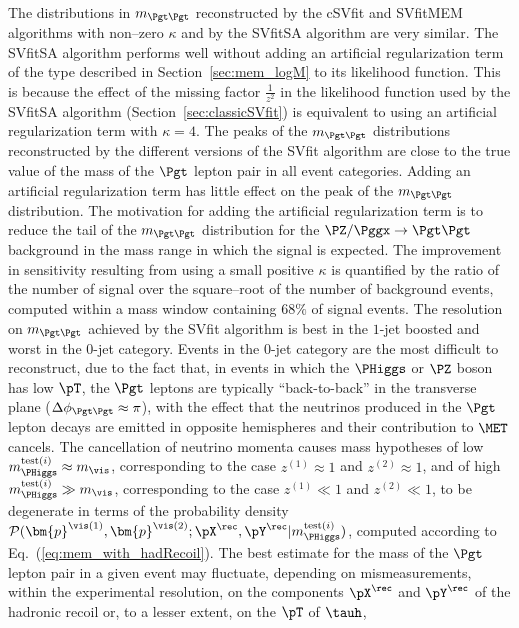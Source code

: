 The distributions in $m_{\Pgt\Pgt}$ reconstructed by the cSVfit and SVfitMEM algorithms with non--zero $\kappa$
and by the SVfitSA algorithm are very similar.
The SVfitSA algorithm performs well without adding an artificial regularization term of the type described in Section~\ref{sec:mem_logM} to its likelihood function.
This is because the effect of the missing factor $\frac{1}{z^{2}}$ in the likelihood function used by the SVfitSA algorithm (\cf Section~\ref{sec:classicSVfit})
is equivalent to using an artificial regularization term with $\kappa = 4$.
The peaks of the $m_{\Pgt\Pgt}$ distributions reconstructed by the different versions of the SVfit algorithm are close to the true value of the mass of the $\Pgt$ lepton pair
in all event categories.
Adding an artificial regularization term has little effect on the peak of the $m_{\Pgt\Pgt}$ distribution.
The motivation for adding the artificial regularization term is to reduce the tail of the $m_{\Pgt\Pgt}$ distribution for the
$\PZ/\Pggx \to \Pgt\Pgt$ background in the mass range in which the signal is expected.
The improvement in sensitivity resulting from using a small positive $\kappa$ is quantified by the ratio of the number of signal over the square--root of the number of background events,
computed within a mass window containing $68\%$ of signal events.
The resolution on $m_{\Pgt\Pgt}$ achieved by the SVfit algorithm is best in the $1$-jet boosted and worst in the $0$-jet category.
Events in the $0$-jet category are the most difficult to reconstruct,
due to the fact that, in events in which the $\PHiggs$ or $\PZ$ boson has low $\pT$, 
the $\Pgt$ leptons are typically ``back-to-back'' in the transverse plane ($\Delta\phi_{\Pgt\Pgt} \approx \pi$),
with the effect that the neutrinos produced in the $\Pgt$ lepton decays are emitted in opposite hemispheres and their contribution to $\MET$ cancels.
The cancellation of neutrino momenta causes mass hypotheses of low $m_{\PHiggs}^{\textrm{test}(i)} \approx m_{\vis}$, corresponding to the case $z^{(1)} \approx 1$ and $z^{(2)} \approx 1$,
and of high $m_{\PHiggs}^{\textrm{test}(i)} \gg m_{\vis}$, corresponding to the case $z^{(1)} \ll 1$ and $z^{(2)} \ll 1$,
to be degenerate in terms of the probability density $\mathcal{P}(\bm{p}^{\vis(1)},\bm{p}^{\vis(2)};\pX^{\rec},\pY^{\rec}|m_{\PHiggs}^{\textrm{test}(i)})$,
computed according to Eq.~(\ref{eq:mem_with_hadRecoil}).
The best estimate for the mass of the $\Pgt$ lepton pair in a given event may fluctuate, 
depending on mismeasurements, within the experimental resolution, 
on the components $\pX^{\rec}$ and $\pY^{\rec}$ of the hadronic recoil or, to a lesser extent, on the $\pT$ of $\tauh$,
